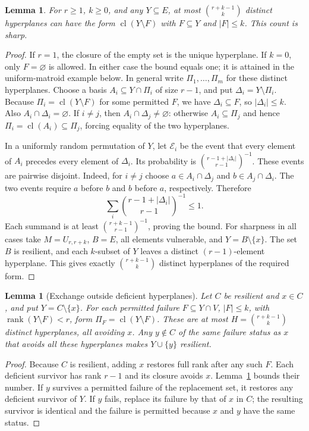 \documentclass[11pt]{article}
\newtheorem{lemma}[theorem]{Lemma}
\theoremstyle{definition}
\theoremstyle{remark}\newtheorem{remark}[theorem]{Remark}
\DeclareMathOperator{\rk}{rank}
\DeclareMathOperator{\cl}{cl}
\begin{document}
\begin{lemma}\label{lem:hyperplanes}
For $r\ge1$, $k\ge0$, and any $Y\subseteq E$, at most $\binom{r+k-1}{k}$ distinct hyperplanes can have the form $\cl(Y\setminus F)$ with $F\subseteq Y$ and $|F|\leq k$. This count is sharp.
\end{lemma}
\begin{proof}
If $r=1$, the closure of the empty set is the unique hyperplane.
If $k=0$, only $F=\varnothing$ is allowed. In either case the
bound equals one; it is attained in the uniform-matroid example
below. In general write
$\Pi_1,\ldots,\Pi_m$ for these distinct hyperplanes. Choose a basis $A_i\subseteq Y\cap \Pi_i$ of size $r-1$, and put $\Delta_i=Y\setminus \Pi_i$. Because $\Pi_i=\cl(Y\setminus F)$ for some permitted $F$, we have $\Delta_i\subseteq F$, so $|\Delta_i|\leq k$. Also $A_i\cap \Delta_i=\varnothing$. If $i\ne j$, then $A_i\cap \Delta_j\ne\varnothing$: otherwise $A_i\subseteq \Pi_j$ and hence $\Pi_i=\cl(A_i)\subseteq \Pi_j$, forcing equality of the two hyperplanes.

In a uniformly random permutation of $Y$, let $\mathcal E_i$ be the event that every element of $A_i$ precedes every element of $\Delta_i$. Its probability is $\binom{r-1+|\Delta_i|}{r-1}^{-1}$. These events
are pairwise disjoint. Indeed, for $i\ne j$ choose $a\in A_i\cap \Delta_j$ and $b\in A_j\cap \Delta_i$. The two events require $a$ before $b$ and $b$ before $a$, respectively.
Therefore
\[
 \sum_i\binom{r-1+|\Delta_i|}{r-1}^{-1}\leq1.
\]
Each summand is at least $\binom{r+k-1}{r-1}^{-1}$, proving the bound. For sharpness in all cases take $M=U_{r,r+k}$, $B=E$, all elements vulnerable, and $Y=B\setminus\{x\}$. The set $B$ is resilient, and each $k$-subset of $Y$ leaves a distinct $(r-1)$-element hyperplane. This gives exactly $\binom{r+k-1}{k}$ distinct hyperplanes of the required form.
\end{proof}

\begin{lemma}[Exchange outside deficient hyperplanes]\label{lem:exchange}
Let $C$ be resilient and $x\in C$, and put $Y=C\setminus\{x\}$.
For each permitted failure $F\subseteq Y\cap V$, $|F|\le k$,
with $\rk(Y\setminus F)<r$, form $\Pi_F=\cl(Y\setminus F)$.
These are at most $H=\binom{r+k-1}{k}$ distinct hyperplanes,
all avoiding $x$. Any $y\notin C$ of the same failure status as $x$
that avoids all these hyperplanes makes $Y\cup\{y\}$ resilient.
\end{lemma}
\begin{proof}
Because $C$ is resilient, adding $x$ restores full rank after any
such $F$. Each deficient survivor has rank $r-1$ and its closure
avoids $x$. Lemma~\ref{lem:hyperplanes} bounds their number.
If $y$ survives a permitted failure of the replacement set,
it restores any deficient survivor of $Y$. If $y$ fails, replace
its failure by that of $x$ in $C$; the resulting survivor is
identical and the failure is permitted because $x$ and $y$ have
the same status.
\end{proof}
\end{document}
